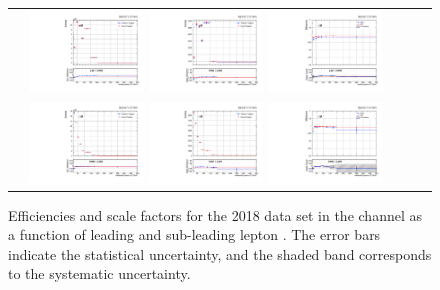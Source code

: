 \begin{figure}[htb]
  \begin{center}
    \begin{tabular}{ccc}
      \includegraphics[width=0.30\textwidth]{fig_2018_TrigSF/g_lepApt_mumu_MC.pdf}
      \includegraphics[width=0.30\textwidth]{fig_2018_TrigSF/g_lepApt_mumu_data.pdf}
      \includegraphics[width=0.30\textwidth]{fig_2018_TrigSF/g_mumu_lepApt_FullSystUncBand.pdf}\\
      \includegraphics[width=0.30\textwidth]{fig_2018_TrigSF/g_lepBpt_mumu_MC.pdf}
      \includegraphics[width=0.30\textwidth]{fig_2018_TrigSF/g_lepBpt_mumu_data.pdf}
      \includegraphics[width=0.30\textwidth]{fig_2018_TrigSF/g_mumu_lepBpt_FullSystUncBand.pdf}\\
    \end{tabular}
    \caption{Efficiencies and scale factors for the 2018 data set in the \mumu channel as a function of leading and sub-leading lepton \pT.
            The error bars indicate the statistical uncertainty, and the shaded band corresponds to the systematic uncertainty.
            }
    \label{TrigSF_2018_3}
  \end{center}
\end{figure}

